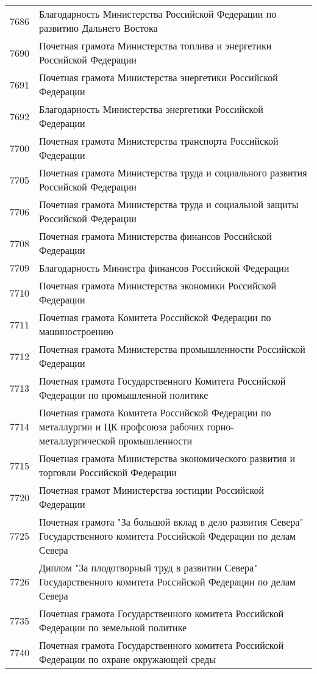 \documentclass[10pt, a4paper, titlepage]{article}
\begin{document}
\begin{center}
\begin{longtable}{rp{}}
        7686 & Благодарность Министерства Российской Федерации по развитию Дальнего Востока \\
        7690 & Почетная грамота Министерства топлива и энергетики Российской Федерации \\
        7691 & Почетная грамота Министерства энергетики Российской Федерации \\
        7692 & Благодарность Министерства энергетики Российской Федерации \\
        7700 & Почетная грамота Министерства транспорта Российской Федерации \\
        7705 & Почетная грамота Министерства труда и социального развития Российской Федерации \\
        7706 & Почетная грамота Министерства труда и социальной защиты Российской Федерации \\
        7708 & Почетная грамота Министерства финансов Российской Федерации \\
        7709 & Благодарность Министра финансов Российской Федерации \\
        7710 & Почетная грамота Министерства экономики Российской Федерации \\
        7711 & Почетная грамота Комитета Российской Федерации по машиностроению \\
        7712 & Почетная грамота Министерства промышленности Российской Федерации \\
        7713 & Почетная грамота Государственного Комитета Российской Федерации по промышленной политике \\
        7714 & Почетная грамота Комитета Российской Федерации по металлургии и ЦК профсоюза рабочих горно-металлургической промышленности \\
        7715 & Почетная грамота Министерства экономического развития и торговли Российской Федерации \\
        7720 & Почетная грамот Министерства юстиции Российской Федерации \\
        7725 & Почетная грамота "За большой вклад в дело развития Севера" Государственного комитета Российской Федерации по делам Севера \\
        7726 & Диплом "За плодотворный труд в развитии Севера" Государственного комитета Российской Федерации по делам Севера \\
        7735 & Почетная грамота Государственного комитета Российской Федерации по земельной политике \\
        7740 & Почетная грамота Государственного комитета Российской Федерации по охране окружающей среды \\

\end{longtable}
\end{center}
\end{document}
